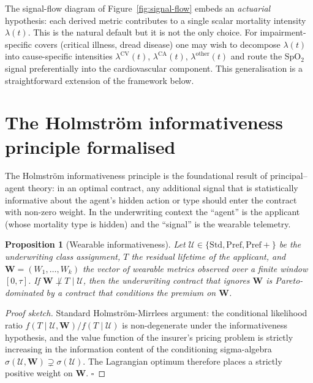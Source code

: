 \documentclass[11pt,a4paper]{article}
\let\origsection\section
\renewcommand{\section}{\clearpage\origsection}
\theoremstyle{ia}
\newtheorem{proposition}[theorem]{Proposition}
\newcommand{\1}{\mathbf{1}}
\begin{document}
\begin{rbox}
The signal-flow diagram of Figure~\ref{fig:signal-flow} embeds an
\emph{actuarial} hypothesis: each derived metric contributes to a
single scalar mortality intensity $\lambda(t)$. This is the natural
default but it is not the only choice. For impairment-specific covers
(critical illness, dread disease) one may wish to decompose
$\lambda(t)$ into cause-specific intensities $\lambda^{\mathrm{CV}}(t)$,
$\lambda^{\mathrm{CA}}(t)$, $\lambda^{\mathrm{other}}(t)$ and route the
SpO$_2$ signal preferentially into the cardiovascular component. This
generalisation is a straightforward extension of the framework below.
\end{rbox}

\section{The Holmstr\"om informativeness principle formalised}\label{sec:holmstrom}

The Holmstr\"om informativeness principle \citep{Holmstrom1979} is the
foundational result of principal--agent theory: in an optimal contract,
any additional signal that is statistically informative about the
agent's hidden action or type should enter the contract with non-zero
weight. In the underwriting context the ``agent'' is the applicant
(whose mortality type is hidden) and the ``signal'' is the wearable
telemetry.

\begin{proposition}[Wearable informativeness]\label{prop:holmstrom}
Let $\mathcal{U}\in\{\mathrm{Std},\mathrm{Pref},\mathrm{Pref+}\}$ be
the underwriting class assignment, $T$ the residual lifetime of the
applicant, and $\mathbf{W}=(W_1,\dots,W_k)$ the vector of wearable
metrics observed over a finite window $[0,\tau]$. If
$\mathbf{W}\not\perp T \mid \mathcal{U}$, then the underwriting
contract that ignores $\mathbf{W}$ is Pareto-dominated by a contract
that conditions the premium on $\mathbf{W}$.
\end{proposition}

\begin{proof}[Proof sketch] Standard Holmstr\"om-Mirrlees argument:
the conditional likelihood ratio
$f(T\mid\mathcal{U},\mathbf{W})/f(T\mid\mathcal{U})$ is non-degenerate
under the informativeness hypothesis, and the value function of the
insurer's pricing problem is strictly increasing in the information
content of the conditioning sigma-algebra
$\sigma(\mathcal{U},\mathbf{W}) \supsetneq \sigma(\mathcal{U})$.
The Lagrangian optimum therefore places a strictly positive weight on
$\mathbf{W}$. $\square$
\end{proof}
\end{document}
